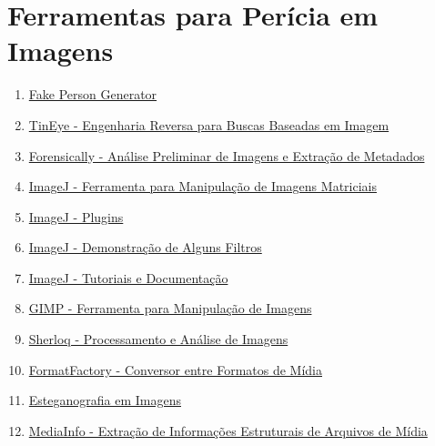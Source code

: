 \documentclass{article}
\begin{document}
\section{Ferramentas para Perícia em Imagens}
\begin{enumerate}
\item \href{https://thispersondoesnotexist.com/}{Fake Person Generator}
\item \href{https://tineye.com/}{TinEye - Engenharia Reversa para Buscas Baseadas em Imagem}
\item \href{https://29a.ch/photo-forensics/#forensic-magnifier}{Forensically - Análise Preliminar de Imagens e Extração de Metadados}
\item \href{https://imagej.nih.gov/}{ImageJ - Ferramenta para Manipulação de Imagens Matriciais}
\item \href{https://imagej.nih.gov/ij/plugins/index.html#filters}{ImageJ - Plugins}
\item \href{https://www.youtube.com/watch?v=P1OjcHWeuew}{ImageJ - Demonstração de Alguns Filtros}
\item \href{https://imagej.nih.gov/ij/docs/examples/index.html}{ImageJ - Tutoriais e Documentação}
\item \href{https://www.gimp.org/}{GIMP - Ferramenta para Manipulação de Imagens}
\item \href{https://github.com/GuidoBartoli/sherloq}{Sherloq - Processamento e Análise de Imagens}
\item \href{http://www.pcfreetime.com/formatfactory/}{FormatFactory - Conversor entre Formatos de Mídia}
\item \href{https://stylesuxx.github.io/steganography/}{Esteganografia em Imagens}
\item \href{https://mediaarea.net/pt/MediaInfo}{MediaInfo - Extração de Informações Estruturais de Arquivos de Mídia}
\end{enumerate}
\end{document}
